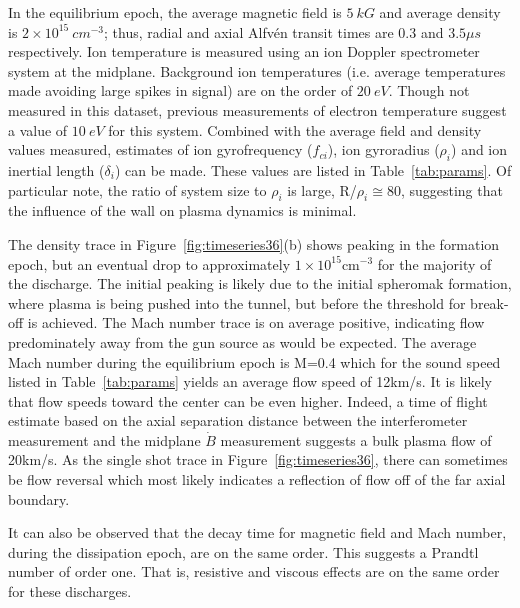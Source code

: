 \documentclass[12pt]{iopart}
\begin{document}
In the equilibrium epoch, the average magnetic field is $5~kG$ and average density is $2\times 10^{15}~cm^{-3}$; thus, radial and axial Alfv\'en transit times are 0.3 and $3.5\mu s$ respectively. Ion temperature is measured using an ion Doppler spectrometer system at the midplane. Background ion temperatures (i.e. average temperatures made avoiding large spikes in signal) are on the order of $20~eV$. Though not measured in this dataset, previous measurements of electron temperature suggest a value of $10~eV$ for this system. Combined with the average field and density values measured, estimates of ion gyrofrequency ($f_{ci}$), ion gyroradius ($\rho_{i}$) and ion inertial length ($\delta_{i}$) can be made. These values are listed in Table~\ref{tab:params}. Of particular note, the ratio of system size to $\rho_{i}$ is large, R/$\rho_{i} \cong 80$, suggesting that the influence of the wall on plasma dynamics is minimal.

The density trace in Figure~\ref{fig:timeseries36}(b) shows peaking in the formation epoch, but an eventual drop to approximately $1\times 10^{15}$cm$^{-3}$ for the majority of the discharge. The initial peaking is likely due to the initial spheromak formation, where plasma is being pushed into the tunnel, but before the threshold for break-off is achieved. The Mach number trace is on average positive, indicating flow predominately away from the gun source as would be expected. The average Mach number during the equilibrium epoch is M=0.4 which for the sound speed listed in Table~\ref{tab:params} yields an average flow speed of 12km/s. It is likely that flow speeds toward the center can be even higher. Indeed, a time of flight estimate based on the axial separation distance between the interferometer measurement and the midplane $\dot{B}$ measurement suggests a bulk plasma flow of 20km/s. As the single shot trace in Figure~\ref{fig:timeseries36}, there can sometimes be flow reversal which most likely indicates a reflection of flow off of the far axial boundary.

It can also be observed that the decay time for magnetic field and Mach number, during the dissipation epoch, are on the same order. This suggests a Prandtl number of order one. That is, resistive and viscous effects are on the same order for these discharges.
\end{document}
